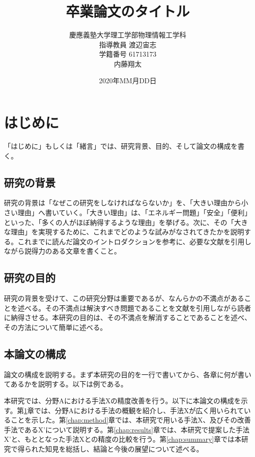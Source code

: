 \documentclass[titlepage]{jsreport}
\title{卒業論文のタイトル}
\author{慶應義塾大学理工学部物理情報工学科\\
指導教員 渡辺宙志\\
学籍番号 61713173\\
内藤翔太}
\date{2020年MM月DD日}
\begin{document}
\maketitle

\tableofcontents

\chapter{はじめに} \label{chap:introduction}

「はじめに」もしくは「緒言」では、研究背景、目的、そして論文の構成を書く。

\section{研究の背景}

研究の背景は「なぜこの研究をしなければならないか」を、「大きい理由から小さい理由」へ書いていく。「大きい理由」は、「エネルギー問題」「安全」「便利」といった、「多くの人がほぼ納得するような理由」を挙げる。次に、その「大きな理由」を実現するために、これまでどのような試みがなされてきたかを説明する。これまでに読んだ論文のイントロダクションを参考に、必要な文献を引用しながら説得力のある文章を書くこと。

\section{研究の目的}

研究の背景を受けて、この研究分野は重要であるが、なんらかの不満点があることを述べる。その不満点は解決すべき問題であることを文献を引用しながら読者に納得させる。本研究の目的は、その不満点を解消することであることを述べ、その方法について簡単に述べる。

\section{本論文の構成}

論文の構成を説明する。まず本研究の目的を一行で書いてから、各章に何が書いてあるかを説明する。以下は例である。


本研究では、分野Aにおける手法Xの精度改善を行う。以下に本論文の構成を示す。第\ref{chap:introduction}章では、分野Aにおける手法の概観を紹介し、手法Xが広く用いられていることを示した。第\ref{chap:method}章では、本研究で用いる手法X、及びその改善手法であるX'について説明する。第\ref{chap:results}章では、本研究で提案した手法X'と、もととなった手法Xとの精度の比較を行う。第\ref{chap:summary}章では本研究で得られた知見を総括し、結論と今後の展望について述べる。
\end{document}
